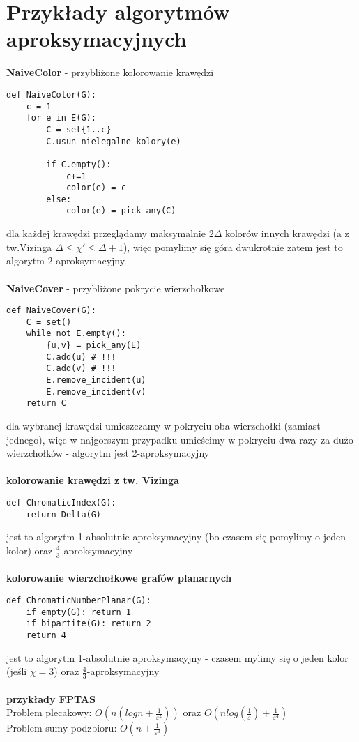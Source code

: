 \documentclass{article}
\begin{document}
\section{Przykłady algorytmów aproksymacyjnych}

\textbf{NaiveColor} - przybliżone kolorowanie krawędzi
\begin{lstlisting}
def NaiveColor(G):
	c = 1
	for e in E(G):
		C = set{1..c}
		C.usun_nielegalne_kolory(e)

		if C.empty():
			c+=1
			color(e) = c
		else:	
			color(e) = pick_any(C)
\end{lstlisting}
dla każdej krawędzi przeglądamy maksymalnie $2\Delta$ kolorów innych krawędzi (a z tw.Vizinga $\Delta \leq \chi' \leq \Delta + 1$), więc pomylimy się góra dwukrotnie zatem jest to algorytm 2-aproksymacyjny \\\\
\textbf{NaiveCover} - przybliżone pokrycie wierzchołkowe
\begin{lstlisting}
def NaiveCover(G):
	C = set()
	while not E.empty():
		{u,v} = pick_any(E)		
		C.add(u) # !!!
		C.add(v) # !!!
		E.remove_incident(u)
		E.remove_incident(v)
	return C
\end{lstlisting}
dla wybranej krawędzi umieszczamy w pokryciu oba wierzchołki (zamiast jednego), więc w najgorszym przypadku umieścimy w pokryciu dwa razy za dużo wierzchołków - algorytm jest 2-aproksymacyjny\\\\
\textbf{kolorowanie krawędzi z tw. Vizinga}
\begin{lstlisting}
def ChromaticIndex(G):
	return Delta(G)
\end{lstlisting}
jest to algorytm 1-absolutnie aproksymacyjny (bo czasem się pomylimy o jeden kolor) oraz $\frac{4}{3}$-aproksymacyjny \\\\
\textbf{kolorowanie wierzchołkowe grafów planarnych}
\begin{lstlisting}
def ChromaticNumberPlanar(G):
	if empty(G): return 1
	if bipartite(G): return 2
	return 4
\end{lstlisting}
jest to algorytm 1-absolutnie aproksymacyjny - czasem mylimy się o jeden kolor (jeśli $\chi = 3$) oraz $\frac{4}{3}$-aproksymacyjny \\\\
\textbf{przykłady FPTAS} \\
Problem plecakowy: $O(n(logn + \frac{1}{\varepsilon^2}))$ oraz $O(nlog(\frac{1}{\varepsilon}) + \frac{1}{\varepsilon^4} )$ \\
Problem sumy podzbioru: $O(n + \frac{1}{\varepsilon^3})$
\end{document}
